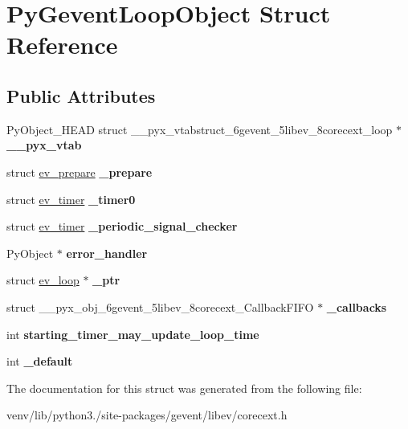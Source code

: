 \hypertarget{struct_py_gevent_loop_object}{}\section{Py\+Gevent\+Loop\+Object Struct Reference}
\label{struct_py_gevent_loop_object}
\subsection*{Public Attributes}
\begin{DoxyCompactItemize}
\item 
\mbox{\label{struct_py_gevent_loop_object_a7fd2f66fb72ace0ac7da3cd19b27c303}} 
Py\+Object\+\_\+\+H\+E\+AD struct \+\_\+\+\_\+pyx\+\_\+vtabstruct\+\_\+6gevent\+\_\+5libev\+\_\+8corecext\+\_\+loop $\ast$ {\bfseries \+\_\+\+\_\+pyx\+\_\+vtab}
\item 
\mbox{\label{struct_py_gevent_loop_object_a07689af25a72aa4f5d41b6ae4363be8a}} 
struct \hyperlink{structev__prepare}{ev\+\_\+prepare} {\bfseries \+\_\+prepare}
\item 
\mbox{\label{struct_py_gevent_loop_object_ad122448a800aec8c40bf2c112d464412}} 
struct \hyperlink{structev__timer}{ev\+\_\+timer} {\bfseries \+\_\+timer0}
\item 
\mbox{\label{struct_py_gevent_loop_object_ad7b654cbe75ee7ebc3fb080a1791135e}} 
struct \hyperlink{structev__timer}{ev\+\_\+timer} {\bfseries \+\_\+periodic\+\_\+signal\+\_\+checker}
\item 
\mbox{\label{struct_py_gevent_loop_object_a4d048a867a78a45cd9105931f7cfa1f6}} 
Py\+Object $\ast$ {\bfseries error\+\_\+handler}
\item 
\mbox{\label{struct_py_gevent_loop_object_afbc1cddb76bdb97315000c0453db10c5}} 
struct \hyperlink{structev__loop}{ev\+\_\+loop} $\ast$ {\bfseries \+\_\+ptr}
\item 
\mbox{\label{struct_py_gevent_loop_object_a204d233c839ae1fb19d4309a328496cf}} 
struct \+\_\+\+\_\+pyx\+\_\+obj\+\_\+6gevent\+\_\+5libev\+\_\+8corecext\+\_\+\+Callback\+F\+I\+FO $\ast$ {\bfseries \+\_\+callbacks}
\item 
\mbox{\label{struct_py_gevent_loop_object_a18584fe4e5c5e2822553b498789c4d4e}} 
int {\bfseries starting\+\_\+timer\+\_\+may\+\_\+update\+\_\+loop\+\_\+time}
\item 
\mbox{\label{struct_py_gevent_loop_object_a5f1af25602ac92810a8ecb0217ac1815}} 
int {\bfseries \+\_\+default}
\end{DoxyCompactItemize}


The documentation for this struct was generated from the following file\+:\begin{DoxyCompactItemize}
\item 
venv/lib/python3./site-\/packages/gevent/libev/corecext.\+h\end{DoxyCompactItemize}
